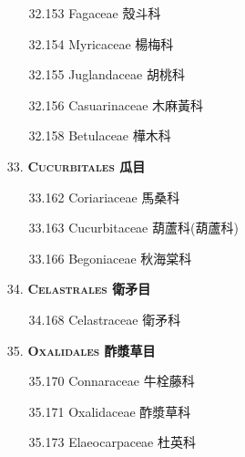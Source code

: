 \begin{enumerate}
\begin{enumerate}
      \item[32.153] Fagaceae 殼斗科     
        
      \item[32.154] Myricaceae 楊梅科     
        
      \item[32.155] Juglandaceae 胡桃科     
        
      \item[32.156] Casuarinaceae 木麻黃科     
        
      \item[32.158] Betulaceae 樺木科     
        
    \end{enumerate}
  \item[33. ] \textbf{\textsc{Cucurbitales} 瓜目}   
    \begin{enumerate}
      \item[33.162] Coriariaceae 馬桑科     
        
      \item[33.163] Cucurbitaceae 葫蘆科(葫蘆科)     
        
      \item[33.166] Begoniaceae 秋海棠科     
        
    \end{enumerate}
  \item[34. ] \textbf{\textsc{Celastrales} 衛矛目}   
    \begin{enumerate}
      \item[34.168] Celastraceae 衛矛科     
        
    \end{enumerate}
  \item[35. ] \textbf{\textsc{Oxalidales} 酢漿草目}   
    \begin{enumerate}
      \item[35.170] Connaraceae 牛栓藤科     
        
      \item[35.171] Oxalidaceae 酢漿草科     
        
      \item[35.173] Elaeocarpaceae 杜英科     

\end{enumerate}
\end{enumerate}
